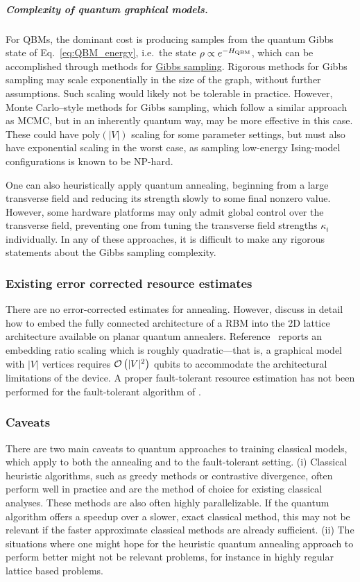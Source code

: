 \begin{refsection}
\subparagraph{Complexity of quantum graphical models.}
For QBMs, the dominant cost is producing samples from the quantum Gibbs state  of Eq.~\eqref{eq:QBM_energy}, i.e.~the state $\rho \propto e^{-H_{\rm QBM}}$, which can be accomplished through methods for \hyperref[prim:GibbsSampling]{Gibbs sampling}. Rigorous methods for Gibbs sampling may scale exponentially in the size of the graph, without further assumptions. Such scaling would likely not be tolerable in practice. However, Monte Carlo--style methods for Gibbs sampling, which follow a similar approach as MCMC, but in an inherently quantum way, may be more effective in this case. These could have $\mathrm{poly}(|V|)$ scaling for some parameter settings, but must also have exponential scaling in the worst case, as sampling low-energy Ising-model configurations is known to be NP-hard. 

One can also heuristically apply quantum annealing, beginning from a large transverse field and reducing its strength slowly to some final nonzero value. However, some hardware platforms may only admit global control over the transverse field, preventing one from tuning the transverse field strengths $\kappa_i$ individually. In any of these approaches, it is difficult to make any rigorous statements about the Gibbs sampling complexity.


\subsubsection*{Existing error corrected resource estimates}
There are no error-corrected estimates for annealing. However, \cite{adachi2015application, benedetti2017quantum} discuss in detail how to embed the fully connected architecture of a RBM into the 2D lattice architecture available on planar quantum annealers.  Reference~\cite{benedetti2017quantum} reports an embedding ratio scaling which is roughly quadratic---that is, a graphical model with $|V|$ vertices requires $\mathcal{O}\left( |V|^2 \right)$ qubits to accommodate the architectural limitations of the device.
A proper fault-tolerant resource estimation has not been performed for the fault-tolerant algorithm of  \cite{wiebe2014quantum}.

\subsubsection*{Caveats}
There are two main caveats to quantum approaches to training classical models, which apply to both the annealing and to the fault-tolerant setting. (i) Classical heuristic algorithms, such as greedy methods or contrastive divergence, often perform well in practice and are the method of choice for existing classical analyses. These methods are also often highly parallelizable.  If the quantum algorithm offers a speedup over a slower, exact classical method, this may not be relevant if the faster approximate classical methods are already sufficient. (ii) The situations where one might hope for the heuristic quantum annealing approach to perform better might not be relevant problems, for instance in highly regular lattice based problems. 


\end{refsection}
